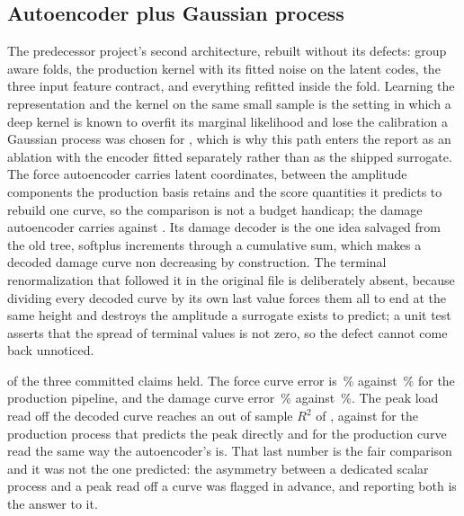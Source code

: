 \documentclass[11pt,a4paper]{article}
\begin{document}
\subsection{Autoencoder plus Gaussian process}
The predecessor project's second architecture, rebuilt without its defects: group aware folds,
the production kernel with its fitted noise on the latent codes, the three input feature
contract, and everything refitted inside the fold. Learning the representation and the kernel
on the same small sample is the setting in which a deep kernel is known to overfit its marginal
likelihood and lose the calibration a Gaussian process was chosen for \cite{ober2021}, which is
why this path enters the report as an ablation with the encoder fitted separately rather than as
the shipped surrogate. The force autoencoder carries
\AblationTwoForceLatent{} latent coordinates, between the \SurrogateComponentsAmplitude{}
amplitude components the production basis retains and the score quantities it predicts to rebuild
one curve, so the comparison is not a budget handicap; the damage autoencoder carries
\AblationTwoDamageLatent{} against \SurrogateComponentsDamage{}. Its damage decoder is the one
idea salvaged from the old tree, softplus increments through a cumulative sum, which makes a
decoded damage curve non decreasing by construction. The terminal renormalization that followed
it in the original file is deliberately absent, because dividing every decoded curve by its own
last value forces them all to end at the same height and destroys the amplitude a surrogate
exists to predict; a unit test asserts that the spread of terminal values is not zero, so the
defect cannot come back unnoticed.

\AblationTwoClaimsHeld{} of the three committed claims held. The force curve error is
\AblationTwoForceLTwo\,\% against \CurveLTwoGP\,\% for the production pipeline, and the damage
curve error \AblationTwoDamageLTwo\,\% against \AblationTwoProductionDamageLTwo\,\%. The peak load
read off the decoded curve reaches an out of sample $R^2$ of \AblationTwoPeakRSq{}, against
\AblationTwoProductionScalarPeakRSq{} for the production process that predicts the peak directly
and \AblationTwoProductionCurvePeakRSq{} for the production curve read the same way the
autoencoder's is. That last number is the fair comparison and it was not the one predicted: the
asymmetry between a dedicated scalar process and a peak read off a curve was flagged in advance,
and reporting both is the answer to it.
\end{document}

